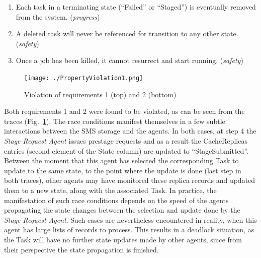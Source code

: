 \documentclass[10pt,conference]{IEEEtran}
\begin{document}
\renewcommand{\labelenumi}{\arabic{enumi}.}
\begin{enumerate}
\item Each task in a terminating state (``Failed'' or ``Staged'') is eventually removed from the system. (\textit{progress})

\item A deleted task will never be referenced for transition to any other state. (\textit{safety})

\item Once a job has been killed, it cannot resurrect and start running. (\textit{safety})

\end{enumerate}

\begin{figure}[!bp]
\texttt{[image: ./PropertyViolation1.png]}
\centering
\vspace{-10 pt}
\caption{Violation of requirements 1 (top) and 2 (bottom)}
\vspace{-8 pt}
\label{fig:PropertyViolation}
\end{figure}
Both requirements 1 and 2 were found to be violated, as can be seen from the traces (Fig.~\ref{fig:PropertyViolation}).
The race conditions manifest themselves in a few subtle interactions between the SMS storage and the agents.
In both cases, at step 4 the \textit{Stage Request Agent} issues prestage requests and 
as a result the CacheReplicas entries (second element of the State column) are updated to ``StageSubmitted''. Between the moment
that this agent has selected the corresponding Task to update to the same state,
to the point where the update is done (last step in both traces),
other agents may have monitored these replica records and updated
them to a new state, along with the associated Task. In practice, the manifestation
of such race conditions depends on the speed of the agents propagating the
state changes between the selection and update done by the \textit{Stage Request Agent}.
Such cases are nevertheless encountered in reality, when this agent
has large lists of records to process. This results in a deadlock situation, as 
the Task will have no further state updates made by other agents, since
from their perspective the state propagation is finished.
\end{document}
